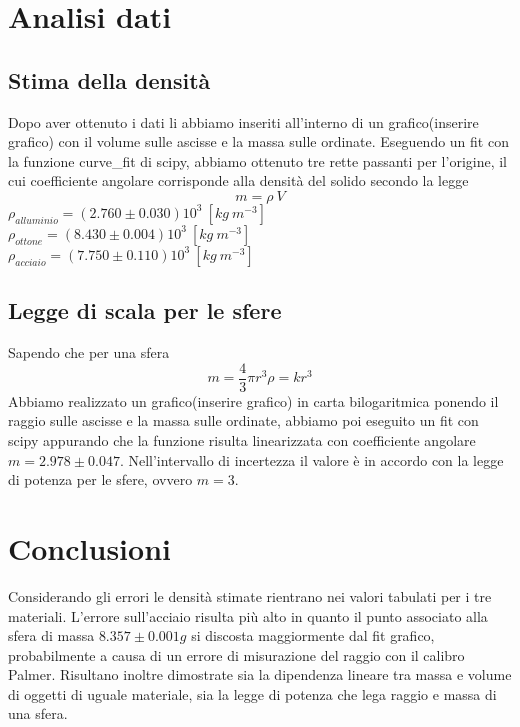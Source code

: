 \documentclass{article}
\begin{document}
	\section{Analisi dati}
		\subsection{Stima della densit\`{a}}
			Dopo aver ottenuto i dati li abbiamo inseriti all'interno di un grafico(inserire grafico) con il volume sulle ascisse e la massa sulle ordinate. Eseguendo un fit con la funzione curve\_fit di scipy, abbiamo ottenuto tre rette passanti per l'origine, il cui coefficiente angolare corrisponde alla densità del solido secondo la legge
			\begin{equation}
				m = \rho\:V
			\end{equation}
			$\rho_{alluminio} = (2.760\pm0.030)10^3\: [kg\:m^{-3}]$\\
			$\rho_{ottone} = (8.430\pm0.004)10^3\: [kg\:m^{-3}]$\\
			$\rho_{acciaio} = (7.750\pm0.110)10^3\: [kg\:m^{-3}]$
		\subsection{Legge di scala per le sfere}
			Sapendo che per una sfera
			\begin{equation}
				m = \frac{4}{3}\pi r^3\rho= kr^3
			\end{equation}
			Abbiamo realizzato un grafico(inserire grafico) in carta bilogaritmica ponendo il raggio sulle ascisse e la massa sulle ordinate, abbiamo poi eseguito un fit con scipy appurando che la funzione risulta linearizzata con coefficiente angolare $m = 2.978\pm0.047$. Nell’intervallo di incertezza il valore è in accordo con la legge di potenza per le sfere, ovvero $m = 3$.
	
	\section{Conclusioni}
		Considerando gli errori le densità stimate rientrano nei valori tabulati per i tre materiali. L'errore sull'acciaio risulta più alto in quanto il punto associato alla sfera di massa $8.357\pm0.001g$ si discosta maggiormente dal fit grafico, probabilmente a causa di un errore di misurazione del raggio con il calibro Palmer.
		Risultano inoltre dimostrate sia la dipendenza lineare tra massa e volume di oggetti di uguale materiale, sia la legge di potenza che lega raggio e massa di una sfera.
	
\end{document}
